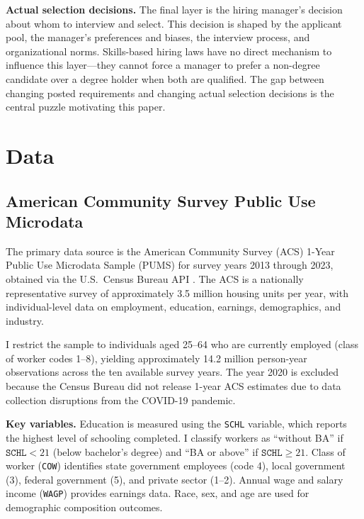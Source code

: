 \documentclass[12pt]{article}
\begin{document}
\textbf{Actual selection decisions.} The final layer is the hiring manager's decision about whom to interview and select. This decision is shaped by the applicant pool, the manager's preferences and biases, the interview process, and organizational norms. Skills-based hiring laws have no direct mechanism to influence this layer---they cannot force a manager to prefer a non-degree candidate over a degree holder when both are qualified. The gap between changing posted requirements and changing actual selection decisions is the central puzzle motivating this paper.




\section{Data} \label{sec:data}

\subsection{American Community Survey Public Use Microdata}

The primary data source is the American Community Survey (ACS) 1-Year Public Use Microdata Sample (PUMS) for survey years 2013 through 2023, obtained via the U.S.\ Census Bureau API \citep{CensusPUMS}. The ACS is a nationally representative survey of approximately 3.5 million housing units per year, with individual-level data on employment, education, earnings, demographics, and industry.

I restrict the sample to individuals aged 25--64 who are currently employed (class of worker codes 1--8), yielding approximately 14.2 million person-year observations across the ten available survey years. The year 2020 is excluded because the Census Bureau did not release 1-year ACS estimates due to data collection disruptions from the COVID-19 pandemic.

\textbf{Key variables.} Education is measured using the \texttt{SCHL} variable, which reports the highest level of schooling completed. I classify workers as ``without BA'' if $\texttt{SCHL} < 21$ (below bachelor's degree) and ``BA or above'' if $\texttt{SCHL} \geq 21$. Class of worker (\texttt{COW}) identifies state government employees (code 4), local government (3), federal government (5), and private sector (1--2). Annual wage and salary income (\texttt{WAGP}) provides earnings data. Race, sex, and age are used for demographic composition outcomes.
\end{document}
